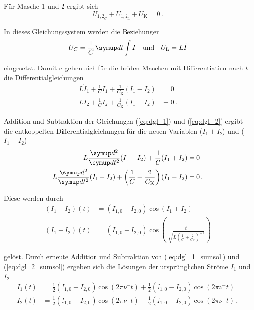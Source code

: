 Für Masche 1 und 2 ergibt sich
\begin{equation}
    U_{{1,2}_{C}} + U_{{1,2}_\text{L}} + U_\text{K} = 0 \,.
\end{equation}

In dieses Gleichungssystem werden die Beziehungen
\begin{equation} 
    U_{C} = \frac{1}{C} \dif{t} \int I \quad\text{und}\quad U_\text{L} = L \dot{I} 
\end{equation}

eingesetzt. Damit ergeben sich für die beiden Maschen mit Differentiation nach $t$ die Differentialgleichungen
\begin{align}  
    L {\dot{I}}_{1} + \frac{1}{C} I_{1} + \frac{1}{C_\text{K}} (I_{1} - I_{2})  &= 0 \label{eq:dgl_1} \\
    L {\dot{I}}_{2} + \frac{1}{C} I_{2} + \frac{1}{C_\text{K}} (I_{1} - I_{2})  &= 0 \label{eq:dgl_2} \,.
\end{align}

Addition und Subtraktion der Gleichungen (\ref{eq:dgl_1}) und (\ref{eq:dgl_2}) ergibt die entkoppelten 
Differentialgleichungen für die neuen Variablen ($I_{1}+I_{2}$) und ($I_{1}-I_{2}$)
\begin{align} 
    L \frac {\dif{^2}} {\dif{t^2}} (I_{1} + I_{2}) + \frac{1}{C} (I_{1} + I_{2})  &= 0 \label{eq:dgl_1_entk} \\
    L \frac {\dif{^2}} {\dif{t^2}} (I_{1} - I_{2}) + \left( \frac{1}{C} + \frac{2}{C_\text{K}} \right) (I_{1} - I_{2})  &= 0 \label{eq:dgl_2_entk} \,.
\end{align}

Diese werden durch
\begin{align}
    (I_{1} + I_{2})(t) &= (I_{1,0} + I_{2,0}) \cos(I_{1} + I_{2}) \label{eq:dgl_1_sumsol} \\
    (I_{1} - I_{2})(t) &= (I_{1,0} - I_{2,0}) \cos \left( \frac {t} {{\sqrt [] {L \left( \frac{1}{C} + \frac{2}{C_\text{K}} \right)^{-1} }}} \right) \label{eq:dgl_2_sumsol}
\end{align}

gelöst. Durch erneute Addition und Subtraktion von (\ref{eq:dgl_1_sumsol}) und (\ref{eq:dgl_2_sumsol}) ergeben sich die Lösungen 
der ursprünglichen Ströme $I_{1}$ und $I_{2}$
\begin{align}
    I_{1}(t) &= \frac{1}{2} (I_{1,0} + I_{2,0}) \cos(2 \pi \nu^+ t)  +  \frac{1}{2} (I_{1,0} - I_{2,0}) \cos(2 \pi \nu^- t) \label{eq:dgl_1_sol} \\
    I_{2}(t) &= \frac{1}{2} (I_{1,0} + I_{2,0}) \cos(2 \pi \nu^+ t)  -  \frac{1}{2} (I_{1,0} - I_{2,0}) \cos(2 \pi \nu^- t) \label{eq:dgl_2_sol} \,,
\end{align}

